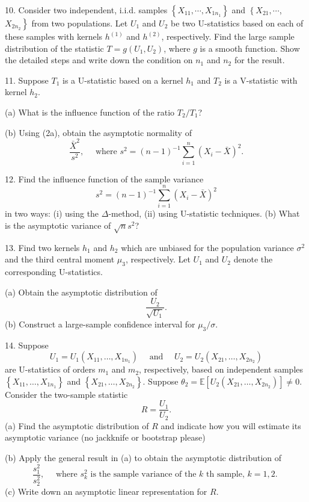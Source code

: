 \documentclass[11pt]{article}
\theoremstyle{definition}
\begin{document}
10. Consider two independent, i.i.d. samples $\left\{X_{11}, \cdots, X_{1 n_1}\right\}$ and $\left\{X_{21}, \cdots\right.$, $\left.X_{2 n_2}\right\}$ from two populations. Let $U_1$ and $U_2$ be two U-statistics based on each of these samples with kernels $h^{(1)}$ and $h^{(2)}$, respectively. Find the large sample distribution of the statistic $T=g\left(U_1, U_2\right)$, where $g$ is a smooth function. Show the detailed steps and write down the condition on $n_1$ and $n_2$ for the result.

11. Suppose $T_1$ is a U-statistic based on a kernel $h_1$ and $T_2$ is a V-statistic with kernel $h_2$.

(a) What is the influence function of the ratio $T_2 / T_1$?

(b) Using (2a), obtain the asymptotic normality of
$$
\frac{\bar{X}^2}{s^2}, \quad \text { where } s^2=(n-1)^{-1} \sum_{i=1}^n\left(X_i-\bar{X}\right)^2 .
$$

12. Find the influence function of the sample variance
$$
s^2=(n-1)^{-1} \sum_{i=1}^n\left(X_i-\bar{X}\right)^2
$$
in two ways:
(i) using the $\Delta$-method,
(ii) using U-statistic techniques.
(b) What is the asymptotic variance of $\sqrt{n} s^2$?

13. Find two kernels $h_1$ and $h_2$ which are unbiased for the population variance $\sigma^2$ and the third central moment $\mu_3$, respectively. Let $U_1$ and $U_2$ denote the corresponding U-statistics.

(a) Obtain the asymptotic distribution of
$$
\frac{U_2}{\sqrt{U_1}} .
$$
(b) Construct a large-sample confidence interval for $\mu_3 / \sigma$.

14. Suppose
$$
U_1=U_1\left(X_{11}, \ldots, X_{1 n_1}\right) \quad \text { and } \quad U_2=U_2\left(X_{21}, \ldots, X_{2 n_2}\right)
$$
are U-statistics of orders $m_1$ and $m_2$, respectively, based on independent samples $\left\{X_{11}, \ldots, X_{1 n_1}\right\}$ and $\left\{X_{21}, \ldots, X_{2 n_2}\right\}$. Suppose $\theta_2=\mathbb{E}\left[U_2\left(X_{21}, \ldots, X_{2 n_2}\right)\right] \neq 0$. Consider the two-sample statistic
$$
R=\frac{U_1}{U_2} .
$$
(a) Find the asymptotic distribution of $R$ and indicate how you will estimate its asymptotic variance (no jackknife or bootstrap please)

(b) Apply the general result in (a) to obtain the asymptotic distribution of
$$
\frac{s_1^2}{s_2^2}, \quad \text { where } s_k^2 \text { is the sample variance of the } k \text { th sample, } k=1,2 \text {. }
$$
(c) Write down an asymptotic linear representation for $R$.
\end{document}

